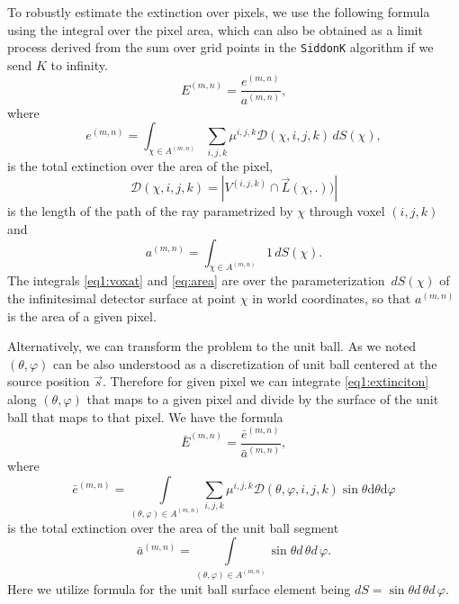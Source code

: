 To robustly estimate the extinction over pixels, we use the following formula using the integral over the pixel area, which can also be obtained as a limit process derived from the sum over grid points in the \texttt{SiddonK} algorithm if we send $K$ to infinity.
\begin{equation}
    E^{(m,n)} = \frac{e^{(m,n)}}{a^{(m,n)}},\label{eq1:integ}
\end{equation}
where
\begin{equation}
    e^{(m,n)} = \int_{\chi \in A^{(m,n)}} \sum_{i,j,k} \mu^{i,j,k} \mathcal{D}(\chi, i, j, k)  \,dS(\chi), \label{eq1:voxat}
\end{equation}
is the total extinction over the area of the pixel,
\begin{equation}
\mathcal{D}(\chi, i, j, k)  = |V^{(i,j,k)} \cap \vec{L}(\chi, .))|
\end{equation}
is the length of the path of the ray parametrized by $\chi$ through voxel $(i,j,k)$ and
\begin{equation}
    a^{(m,n)} = \int_{\chi \in A^{(m,n)}} 1  \,dS(\chi).
    \label{eq:area}
\end{equation}
The integrals \eqref{eq1:voxat} and \eqref{eq:area} are over the parameterization $\,dS(\chi)$ of the infinitesimal detector surface at point $\chi$ in world coordinates, so that $a^{(m,n)}$ is the area of a given pixel.

Alternatively, we can transform the problem to the unit ball. As we noted $(\theta, \varphi)$ can be also understood as a discretization of unit ball centered at the source position $\vec{s}$. Therefore for given pixel we can integrate \eqref{eq1:extinciton} along $(\theta, \varphi)$ that maps to a given pixel and divide by the surface of the unit ball that maps to that pixel. We have the formula
\begin{equation}
    \bar{E}^{(m,n)} = \frac{\bar{e}^{(m,n)}}{\bar{a}^{(m,n)}},\label{eq1:integub}
\end{equation}
where
\begin{equation}
    \bar{e}^{(m,n)} = \int\limits_{(\theta, \varphi) \in A^{(m,n)}}  \sum_{i,j,k} \mu^{i,j,k} \mathcal{D}(\theta, \varphi, i, j, k) \sin\theta \mathrm{d}\theta \mathrm{d}\varphi \label{eq1:voxatub}
\end{equation}
is the total extinction over the area of the unit ball segment
\begin{equation}
    \bar{a}^{(m,n)} = \int\limits_{(\theta, \varphi) \in A^{(m,n)}}  \sin\theta d\,\theta d\,\varphi.\label{eq1:voxsurfub}
\end{equation}
Here we utilize formula for the unit ball surface element being $dS = \sin\theta d\,\theta d\,\varphi$. 


